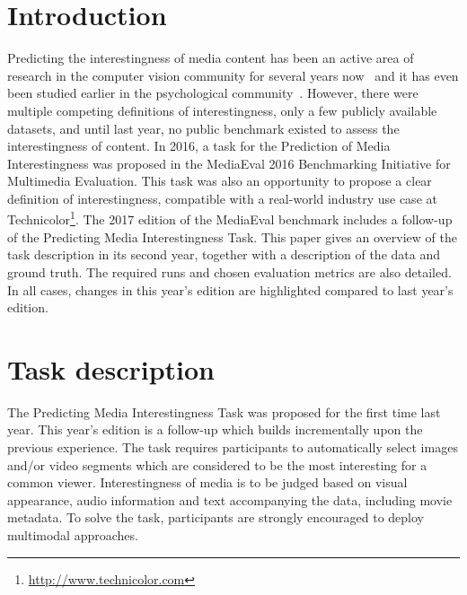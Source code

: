 \documentclass[sigconf]{acmart-me}
\begin{document}
\maketitle

\vspace{-0.2cm}
\section{Introduction}


Predicting the interestingness of media content has been an active area of research in the computer vision community for several years now~\cite{Jiang2013, Gygli2013, Dhar2011, Amengual2015} and it has even been studied earlier in the psychological community~\cite{Berlyne1960, Smith1985, Silvia2006}. However, there were multiple competing definitions of interestingness, only a few publicly available datasets, and until last year, no public benchmark existed to assess the interestingness of content. In 2016, a task for the Prediction of Media Interestingness was proposed in the Media\-Eval 2016 Benchmarking Initiative for Multimedia Evaluation. This task was also an opportunity to propose a clear definition of interestingness, compatible with a real-world industry use case at Technicolor\footnote{\url{http://www.technicolor.com}}. The 2017 edition of the Media\-Eval benchmark includes a follow-up of the Predicting Media Interestingness Task.
This paper gives an overview of the task description in its second year, together with a description of the data and ground truth. The required runs and chosen evaluation metrics are also detailed. In all cases, changes in this year's edition are highlighted compared to last year's edition.


\vspace{-0.2cm}
\section{Task description}

The Predicting Media Interestingness Task was proposed for the first time last year. This year's edition is a follow-up which builds incrementally upon the previous experience. The task requires participants to automatically select images and/or video segments which are considered to be the most interesting for a common viewer. Interestingness of media is to be judged based on visual appearance, audio information and text accompanying the data, including movie metadata. To solve the task, participants are strongly encouraged to deploy multimodal approaches.
\end{document}
